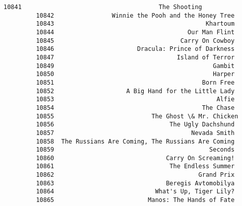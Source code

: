 \documentclass[11pt]{article}
\begin{document}
\begin{Verbatim}[commandchars=\\\{\}]
         10841                                      The Shooting   
         10842                Winnie the Pooh and the Honey Tree   
         10843                                          Khartoum   
         10844                                     Our Man Flint   
         10845                                   Carry On Cowboy   
         10846                       Dracula: Prince of Darkness   
         10847                                  Island of Terror   
         10849                                            Gambit   
         10850                                            Harper   
         10851                                         Born Free   
         10852                    A Big Hand for the Little Lady   
         10853                                             Alfie   
         10854                                         The Chase   
         10855                           The Ghost \& Mr. Chicken   
         10856                                The Ugly Dachshund   
         10857                                      Nevada Smith   
         10858  The Russians Are Coming, The Russians Are Coming   
         10859                                           Seconds   
         10860                               Carry On Screaming!   
         10861                                The Endless Summer   
         10862                                        Grand Prix   
         10863                               Beregis Avtomobilya   
         10864                            What's Up, Tiger Lily?   
         10865                          Manos: The Hands of Fate   
         

\end{Verbatim}
\end{document}
